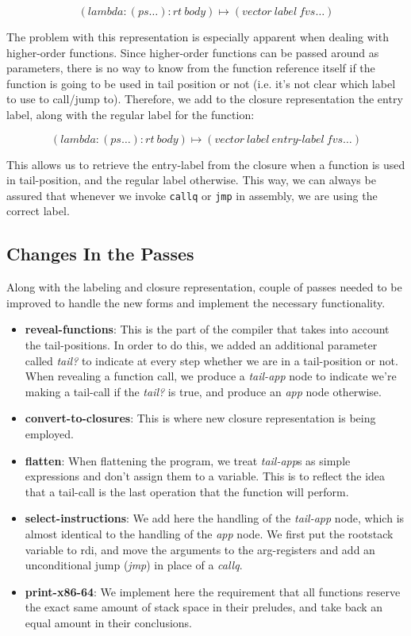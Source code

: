 \documentclass[12pt]{article}
\begin{document}
\begin{equation*}
(lambda: (ps \ldots) : rt\ body) \mapsto (vector\ label\ fvs \ldots)
\end{equation*}

The problem with this representation is especially apparent when dealing with
higher-order functions. Since higher-order functions can be passed around
as parameters, there is no way to know from the function reference
itself if the function is going to be used in tail position or not
(i.e. it's not clear which label to use to call/jump to). Therefore,
we add to the closure representation the entry label, along with
the regular label for the function:

\begin{equation*}
(lambda: (ps \ldots) : rt\ body) \mapsto (vector\ label\ entry \text{-} label\ fvs \ldots)
\end{equation*}

This allows us to retrieve the entry-label from the closure when a function
is used in tail-position, and the regular label otherwise. This way, we
can always be assured that whenever we invoke \verb+callq+ or \verb+jmp+ in
assembly, we are using the correct label.

\subsection{Changes In the Passes}

Along with the labeling and closure representation, couple of passes
needed to be improved to handle the new forms and implement the
necessary functionality.

\begin{itemize}
\item \textbf{reveal-functions}: This is the part of the compiler that
  takes into account the tail-positions. In order to do this, we added
  an additional parameter called \emph{tail?} to indicate at every
  step whether we are in a tail-position or not. When revealing a
  function call, we produce a \emph{tail-app} node to indicate we're
  making a tail-call if the \emph{tail?} is true, and produce an
  \emph{app} node otherwise.
\item \textbf{convert-to-closures}: This is where new closure
  representation is being employed.
\item \textbf{flatten}: When flattening the program, we treat
  \emph{tail-app}s as simple expressions and don't assign them to a
  variable. This is to reflect the idea that a tail-call is the last
  operation that the function will perform.
\item \textbf{select-instructions}: We add here the handling of the
  \emph{tail-app} node, which is almost identical to the handling of
  the \emph{app} node. We first put the rootstack variable to rdi, and
  move the arguments to the arg-registers and add an unconditional
  jump (\emph{jmp}) in place of a \emph{callq}.
\item \textbf{print-x86-64}: We implement here the requirement that
  all functions reserve the exact same amount of stack space in
  their preludes, and take back an equal amount in their conclusions.
\end{itemize}
\end{document}
